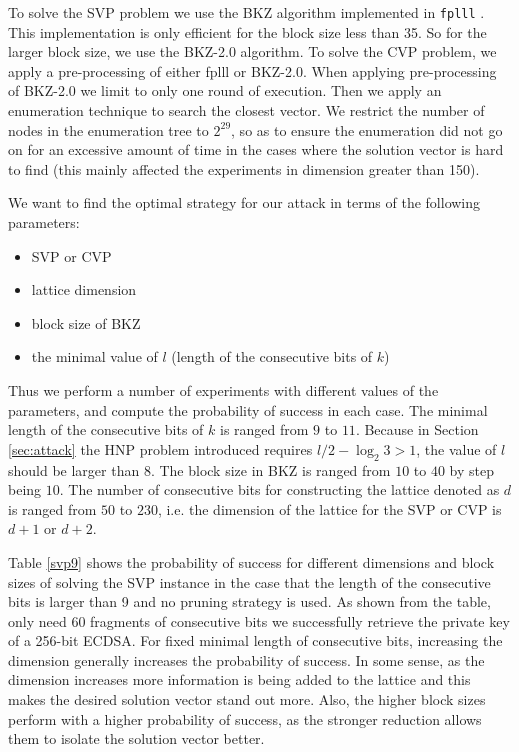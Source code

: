  To solve the SVP problem we use the BKZ algorithm implemented in \verb+fplll+ \cite{fplll}.
This implementation is only efficient for the block size less than 35.
So for the larger block size, we use the BKZ-2.0 \cite{bkz2} algorithm.
To solve the CVP problem, we apply a pre-processing of either fplll or BKZ-2.0.
When applying pre-processing of BKZ-2.0 we limit to only one round of execution.
Then we apply an enumeration technique to search the closest vector.
We restrict the number of nodes in the enumeration tree to $2^{29}$,
   so as to ensure the enumeration did not go on for an excessive amount of time in the cases where the solution vector is hard to find (this mainly affected the experiments in dimension greater than 150).
   
We want to find the optimal strategy for our attack in terms of the following parameters:
\begin{itemize}
 \item  SVP or CVP
 \item  lattice dimension
 \item  block size of BKZ
 \item  the minimal value of $l$ (length of the consecutive bits of $k$)
\end{itemize}

Thus we perform a number of experiments with different values of the parameters,
and compute the probability of success in each case.
The minimal length of the consecutive bits of $k$ is ranged from $9$ to $11$.
Because in Section \ref{sec:attack} the HNP problem introduced requires $l/2 - \log_{2}{3} > 1$, the value of $l$ should be larger than $8$.
The block size in BKZ is ranged from $10$ to $40$ by step being $10$.
The number of consecutive bits for constructing the lattice denoted as $d$ is ranged from $50$ to $230$,
i.e. the dimension of the lattice for the SVP or CVP is $d + 1$ or $d + 2$.

Table \ref{svp9} shows the probability of success for different dimensions and block sizes of solving the SVP instance in the 
             case that the length of the consecutive bits is larger than 9 and no pruning strategy is used.
As shown from the table, only need $60$ fragments of consecutive bits we successfully retrieve the private key of a 256-bit ECDSA.
  For fixed  minimal length of consecutive bits,
 increasing the dimension generally increases the probability of success.
In some sense, as the dimension increases 
     more information is being added to the lattice and this makes the desired solution vector stand out more.
Also, the higher block sizes perform with a higher probability of success,
 as the stronger reduction allows them to isolate the solution vector better.
 
